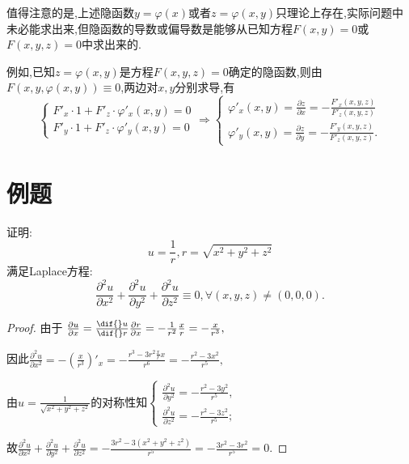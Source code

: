 \begin{remark}
    值得注意的是,上述隐函数$y=\varphi(x)$或者$z=\varphi(x,y)$只理论上存在,实际问题中未必能求出来,但隐函数的导数或偏导数是能够从已知方程$F(x,y)=0$或$F(x,y,z)=0$中求出来的.

    例如,已知$z=\varphi(x,y)$是方程$F(x,y,z)=0$确定的隐函数,则由
    $F(x,y,\varphi(x,y))\equiv 0$,两边对$x,y$分别求导,有
    $$\begin{cases}
        F'_x\cdot 1+F'_z\cdot\varphi'_x(x,y)=0\\
        F'_y\cdot 1+F'_z\cdot\varphi'_y(x,y)=0
    \end{cases}\Rightarrow
    \begin{cases}
        \varphi'_x(x,y)=\frac{\partial z}{\partial x}=-\frac{F'_x(x,y,z)}{F'_z(x,y,z)}\\
        \varphi'_y(x,y)=\frac{\partial z}{\partial y}=-\frac{F'_y(x,y,z)}{F'_z(x,y,z)}.
    \end{cases}$$
\end{remark}

\section{例题}
\begin{example}
    证明:$$u=\frac{1}{r},r=\sqrt{x^2+y^2+z^2}$$满足Laplace方程:
    $$\frac{\partial^2u}{\partial x^2}+\frac{\partial^2u}{\partial y^2}+\frac{\partial^2u}{\partial z^2}\equiv 0,\forall (x,y,z)\neq(0,0,0).$$
\end{example}
\begin{proof}

    由于
    $\frac{\partial u}{\partial x}=\frac{\dif{}u}{\dif{}r}\frac{\partial r}{\partial x}=-\frac{1}{r^2}\frac{x}{r}=-\frac{x}{r^3},$

    因此$\frac{\partial^2 u}{\partial x^2}=-\left(\frac{x}{r^3}\right)'_x=-\frac{r^3-3r^2\frac{x}{r}x}{r^6}=-\frac{r^2-3x^2}{r^5},$

    由$u=\frac{1}{\sqrt{x^2+y^2+z^2}}$的对称性知$
    \begin{cases}
        \frac{\partial^2 u}{\partial y^2}=-\frac{r^2-3y^2}{r^5},\\
        \frac{\partial^2 u}{\partial z^2}=-\frac{r^2-3z^2}{r^5};
    \end{cases}$

    故$\frac{\partial^2u}{\partial x^2}+\frac{\partial^2u}{\partial y^2}+\frac{\partial^2u}{\partial z^2}=-\frac{3r^2-3(x^2+y^2+z^2)}{r^5}=-\frac{3r^2-3r^2}{r^5}=0.$
\end{proof}


